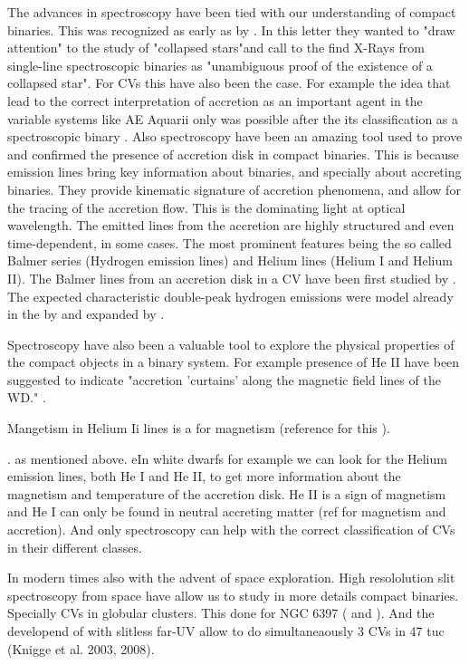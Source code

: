 The advances in spectroscopy have been tied with our understanding of compact binaries. This was recognized as early as \citeyear{zeldovich_collapsed_1966} by \citeauthor{zeldovich_collapsed_1966,}. In this letter they wanted to "draw attention" to the study of "collapsed stars"and call to the find X-Rays from single-line spectroscopic binaries as "unambiguous proof of the existence of a collapsed star". For CVs this have also been the case. For example the idea that lead to the correct interpretation of accretion as an important agent in the variable systems like AE Aquarii only was possible after the its classification as a spectroscopic binary \citep{joy_spectroscopic_1954}. Also spectroscopy have been an amazing tool used to prove and confirmed the presence of accretion disk in compact binaries. This is because emission lines bring key information about binaries, and specially about accreting binaries. They provide kinematic signature of accretion phenomena, and allow for the tracing of the accretion flow. This is the dominating light at optical wavelength. The emitted lines from the accretion are highly structured and even time-dependent, in some cases. The most prominent features being the so called Balmer series (Hydrogen emission lines) and Helium lines (Helium I and Helium II). The Balmer lines from an accretion disk in a CV have been first studied by \cite{williams_emission_1980}. The expected characteristic double-peak hydrogen emissions were model already in the \citeyear{smak_emission_1981} by \citeauthor{smak_emission_1981} and expanded by \cite{horne_emission_1986}. 


Spectroscopy have also been a valuable tool to explore the physical properties of the compact objects in a binary system. For example presence of He II have been suggested to indicate "accretion 'curtains' along the magnetic field lines of the WD." \citep{edmonds_cataclysmic_1999}.  

Mangetism in Helium Ii lines is a for magnetism (reference for this ). 

.   as mentioned above. eIn white dwarfs for example we can look for the Helium emission lines, both He I and He II, to get more information about the magnetism and temperature of the accretion disk. He II is a sign of magnetism and He I can only be found in neutral accreting matter (ref for magnetism and accretion). And only spectroscopy can help with the correct classification of CVs in their different classes.  


In modern times also with the advent of space exploration. High resololution slit spectroscopy from space have allow us to study in more details compact binaries. Specially  CVs in globular clusters. This done for NGC 6397 (\cite{} and \cite{}). And the developend of with slitless far-UV allow to do simultaneaously 3 CVs in 47 tuc \cite{} (Knigge et al. 2003, 2008). 

